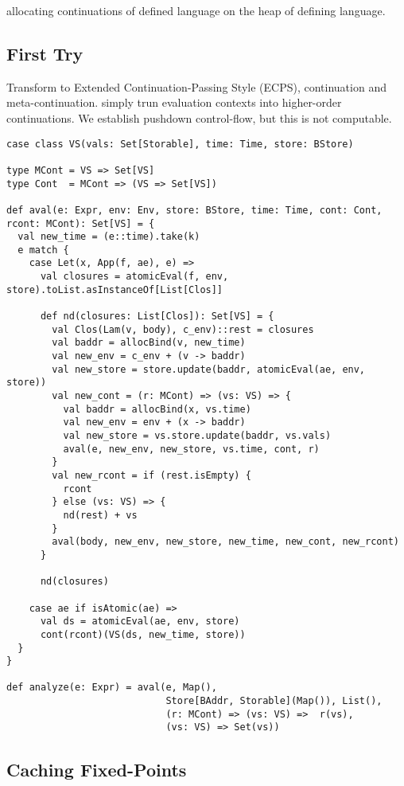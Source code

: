 \documentclass[acmsmall,review,anonymous]{acmart}\settopmatter{printfolios=true,printccs=false,printacmref=false}
\begin{document}
allocating continuations of defined language on the heap of defining language.

\subsection{First Try}

Transform to Extended Continuation-Passing Style (ECPS), continuation and meta-continuation.
simply trun evaluation contexts into higher-order continuations.
We establish pushdown control-flow, but this is not computable.

\begin{lstlisting}
case class VS(vals: Set[Storable], time: Time, store: BStore)

type MCont = VS => Set[VS]
type Cont  = MCont => (VS => Set[VS])

def aval(e: Expr, env: Env, store: BStore, time: Time, cont: Cont, rcont: MCont): Set[VS] = {
  val new_time = (e::time).take(k)
  e match {
    case Let(x, App(f, ae), e) =>
      val closures = atomicEval(f, env, store).toList.asInstanceOf[List[Clos]]

      def nd(closures: List[Clos]): Set[VS] = {
        val Clos(Lam(v, body), c_env)::rest = closures
        val baddr = allocBind(v, new_time)
        val new_env = c_env + (v -> baddr)
        val new_store = store.update(baddr, atomicEval(ae, env, store))
        val new_cont = (r: MCont) => (vs: VS) => {
          val baddr = allocBind(x, vs.time)
          val new_env = env + (x -> baddr)
          val new_store = vs.store.update(baddr, vs.vals)
          aval(e, new_env, new_store, vs.time, cont, r)
        }
        val new_rcont = if (rest.isEmpty) {
          rcont 
        } else (vs: VS) => {
          nd(rest) + vs
        }
        aval(body, new_env, new_store, new_time, new_cont, new_rcont)
      }

      nd(closures)

    case ae if isAtomic(ae) =>
      val ds = atomicEval(ae, env, store)
      cont(rcont)(VS(ds, new_time, store))
  }
}

def analyze(e: Expr) = aval(e, Map(),
                            Store[BAddr, Storable](Map()), List(),
                            (r: MCont) => (vs: VS) =>  r(vs),
                            (vs: VS) => Set(vs))
\end{lstlisting}

\subsection{Caching Fixed-Points}
\end{document}
